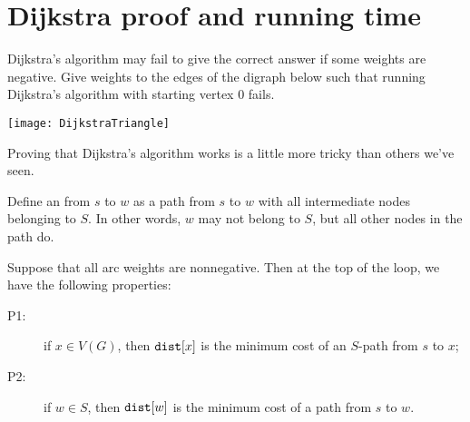 \chapter{Dijkstra proof and running time} %

\begin{Boxample}[0.5] \label{ex:dijk-neg-fails}
Dijkstra's algorithm may fail to give the correct answer if some weights are negative.
Give weights to the edges of the digraph below such that running Dijkstra's algorithm with starting vertex $0$
fails. 
\vspace{0.5cm} 
\begin{center}
\texttt{[image: DijkstraTriangle]}
\end{center}
\end{Boxample}


Proving that Dijkstra's algorithm works is a little more tricky than others we've seen.

Define an  from $s$ to $w$ as a
path from $s$ to $w$ with all intermediate nodes belonging to $S$. In other words, $w$ may not belong to $S$, but all other nodes in the path do.

\begin{Theorem}
\label{thm:dijkstra} Suppose that all arc weights are nonnegative. Then
at the top of the  loop, we have the following properties:
\begin{description}
\item[P1:] if $x\in V(G)$, then $\dist[x]$ is the minimum cost of an $S$-path 
from $s$ to $x$;
\item[P2:] if $w\in S$, then $\dist[w]$ is the minimum cost of a path
from $s$ to $w$.
\end{description}
\end{Theorem}

